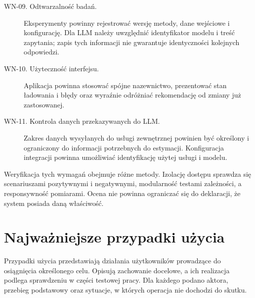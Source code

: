 \begin{description}
    \item[WN-09. Odtwarzalność badań.]
    Eksperymenty powinny rejestrować wersję metody, dane wejściowe i konfigurację. Dla LLM należy uwzględnić identyfikator modelu i treść zapytania; zapis tych informacji nie gwarantuje identyczności kolejnych odpowiedzi.

    \item[WN-10. Użyteczność interfejsu.]
    Aplikacja powinna stosować spójne nazewnictwo, prezentować stan ładowania i błędy oraz wyraźnie odróżniać rekomendację od zmiany już zastosowanej.

    \item[WN-11. Kontrola danych przekazywanych do LLM.]
    Zakres danych wysyłanych do usługi zewnętrznej powinien być określony i ograniczony do informacji potrzebnych do estymacji. Konfiguracja integracji powinna umożliwiać identyfikację użytej usługi i modelu.
\end{description}

Weryfikacja tych wymagań obejmuje różne metody. Izolację dostępu sprawdza się scenariuszami pozytywnymi i negatywnymi, modularność testami zależności, a responsywność pomiarami. Ocena nie powinna ograniczać się do deklaracji, że system posiada daną właściwość.


\section{Najważniejsze przypadki użycia}
\label{sec:przypadki-uzycia}

Przypadki użycia przedstawiają działania użytkowników prowadzące do osiągnięcia określonego celu. Opisują zachowanie docelowe, a ich realizacja podlega sprawdzeniu w części testowej pracy. Dla każdego podano aktora, przebieg podstawowy oraz sytuacje, w których operacja nie dochodzi do skutku.

